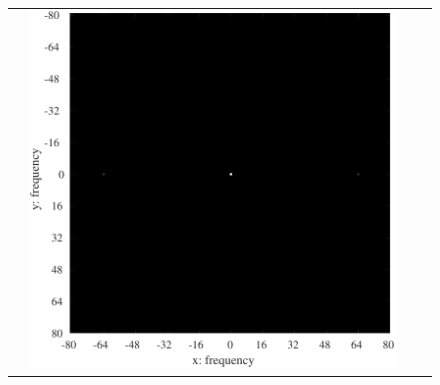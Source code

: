 \begin{figure}[H]
\begin{tabularx}{\textwidth}{p{}CCC}
\begin{minipage}{.25\textwidth}
        \end{minipage} &
        \begin{minipage}{.25\textwidth}
            \centering
            \includegraphics[keepaspectratio,width=.9\textwidth]{../../Figures/08_16_img64-fft.pdf}
        \end{minipage}                                                             \\


\end{tabularx}
\end{figure}
